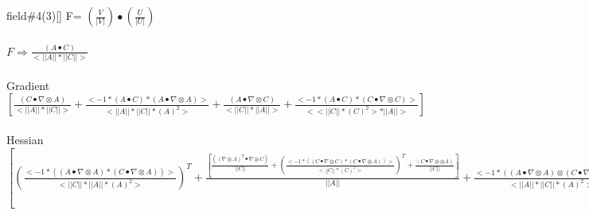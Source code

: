 \documentclass{article}
\begin{document}
field\#4(3)[] F= $(\frac{V}{|V|})\bullet(\frac{U}{|U|})$\\
\\
$F \Longrightarrow \frac{(A \bullet C)}{<||A||*||C||>}$\\
\\
Gradient\\
$[ \frac{(C \bullet  \nabla  \otimes A)}{<||A||*||C||>}+ \frac{<-1*(A \bullet C)*(A \bullet  \nabla  \otimes A)>}{<||A||*||C||*(A)^2>}+ \frac{(A \bullet  \nabla  \otimes C)}{<||C||*||A||>}+ \frac{<-1*(A \bullet C)*(C \bullet  \nabla  \otimes C)>}{<<||C||*(C)^2>*||A||>}]$\\
\\
Hessian\\
$[( \frac{<-1*((A \bullet  \nabla  \otimes A)*(C \bullet  \nabla  \otimes A))>}{<||C||*||A||*(A)^2>})^T+ \frac{[ \frac{(( \nabla  \otimes A)^T \bullet  \nabla  \otimes C)}{||C||}+( \frac{<-1*((C \bullet  \nabla  \otimes C)*(C \bullet  \nabla  \otimes A))>}{<||C||*(C)^2>})^T+ \frac{(C \bullet  \nabla  \otimes  \otimes A)}{||C||}]}{||A||}+ \frac{<-1*((A \bullet  \nabla  \otimes A) \otimes (C \bullet  \nabla  \otimes A))>}{<||A||*||C||*(A)^2>}+ \frac{(( \nabla  \otimes C)^T \bullet  \nabla  \otimes A)}{<||C||*||A||>}+ \frac{<-1*((C \bullet  \nabla  \otimes C) \otimes (C \bullet  \nabla  \otimes A))>}{<<||C||*(C)^2>*||A||>}+ \frac{<-1*((A \bullet  \nabla  \otimes A) \otimes (A \bullet  \nabla  \otimes C))>}{<||A||*||C||*(A)^2>}+ \frac{<(A \bullet C)*(<-1*||A||*||C||*(A)^2*[(( \nabla  \otimes A)^T \bullet  \nabla  \otimes A)+(A \bullet  \nabla  \otimes  \otimes A)]>-<-1*((A \bullet  \nabla  \otimes A) \otimes [ \frac{<||C||*(A)^2*(A \bullet  \nabla  \otimes A)>}{||A||}+<||A||*[ \frac{<(A)^2*(C \bullet  \nabla  \otimes C)>}{||C||}+<2*||C||*(A \bullet  \nabla  \otimes A)>]>])>)>}{<||A||*||C||*(A)^2*||A||*||C||*(A)^2>}+( \frac{<-1*((A \bullet  \nabla  \otimes A)*(A \bullet  \nabla  \otimes C))>}{<||C||*||A||*(A)^2>})^T+ \frac{<-1*-1*(A \bullet C)*((C \bullet  \nabla  \otimes C) \otimes (A \bullet  \nabla  \otimes A))>}{<||C||*(C)^2*||A||*(A)^2>}+ \frac{[( \frac{<-1*((C \bullet  \nabla  \otimes C)*(A \bullet  \nabla  \otimes C))>}{<||C||*(C)^2>})^T+ \frac{(A \bullet  \nabla  \otimes  \otimes C)}{||C||}+ \frac{<-1*((C \bullet  \nabla  \otimes C) \otimes (A \bullet  \nabla  \otimes C))>}{<||C||*(C)^2>}+ \frac{<(A \bullet C)*(<-1*||C||*(C)^2*[(( \nabla  \otimes C)^T \bullet  \nabla  \otimes C)+(C \bullet  \nabla  \otimes  \otimes C)]>-<-1*((C \bullet  \nabla  \otimes C) \otimes [ \frac{<(C)^2*(C \bullet  \nabla  \otimes C)>}{||C||}+<2*||C||*(C \bullet  \nabla  \otimes C)>])>)>}{<||C||*(C)^2*||C||*(C)^2>}]}{||A||}] $\\
\\
\end{document}
